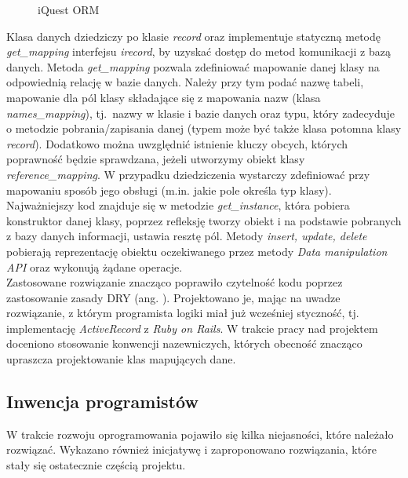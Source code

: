 \newpage
\begin{figure}[H]
\begin{center}
 
\end{center}
\caption{iQuest ORM}\label{fig:iquest-orm}
\end{figure}
\newpage

Klasa danych dziedziczy po klasie \textit{record} oraz implementuje statyczną metodę \textit{get\_mapping} interfejsu \textit{irecord}, by uzyskać dostęp do metod komunikacji z bazą danych. Metoda \textit{get\_mapping} pozwala zdefiniować mapowanie danej klasy na odpowiednią relację w bazie danych. Należy przy tym podać nazwę tabeli, mapowanie dla pól klasy składające się z mapowania nazw (klasa \textit{names\_mapping}), tj.~nazwy w klasie i bazie danych oraz typu, który zadecyduje o metodzie pobrania/zapisania danej (typem może być także klasa potomna klasy \textit{record}). Dodatkowo można uwzględnić istnienie kluczy obcych, których poprawność będzie sprawdzana, jeżeli utworzymy obiekt klasy \textit{reference\_mapping}. W przypadku dziedziczenia wystarczy zdefiniować przy mapowaniu sposób jego obsługi (m.in. jakie pole określa typ klasy). Najważniejszy kod znajduje się w metodzie \textit{get\_instance}, która pobiera konstruktor danej klasy, poprzez refleksję tworzy obiekt i na podstawie pobranych z bazy danych informacji, ustawia resztę pól. Metody \textit{insert, update, delete} pobierają reprezentację obiektu oczekiwanego przez metody \textit{Data manipulation API} oraz wykonują żądane operacje.\\
Zastosowane rozwiązanie znacząco poprawiło czytelność kodu poprzez zastosowanie zasady DRY (ang. ). Projektowano je, mając na uwadze rozwiązanie, z którym programista logiki miał już wcześniej styczność, tj. implementację \textit{ActiveRecord} z \textit{Ruby on Rails}. W trakcie pracy nad projektem doceniono stosowanie konwencji nazewniczych, których obecność znacząco upraszcza projektowanie klas mapujących dane.

\subsection{Inwencja programistów}
\label{Chapter62d}

W trakcie rozwoju oprogramowania pojawiło się kilka niejasności, które należało rozwiązać. Wykazano również inicjatywę i zaproponowano rozwiązania, które stały się ostatecznie częścią projektu. \\

